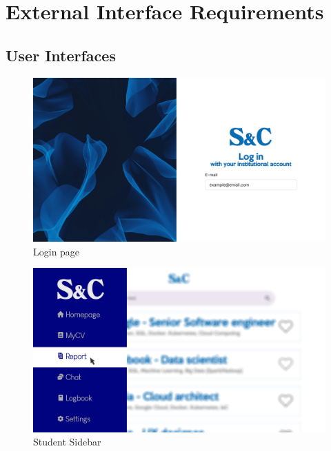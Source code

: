 \section{External Interface Requirements}

\subsection{User Interfaces}
\begin{figure}[H]
      \centering
      \includegraphics[width=\textwidth]{RASD/Assets/User interfaces/login.png}
      \caption{Login page}
      \label{fig:Login page}
\end{figure}
\begin{figure}[H]
      \centering
      \includegraphics[width=\textwidth]{RASD/Assets/User interfaces/sidebar.png}
      \caption{Student Sidebar}
      \label{fig:Student Sidebar}
\end{figure}
